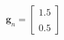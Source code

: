 \documentclass[preview]{standalone}
\begin{document}
\begin{align*}
\mathbf{g}_n = \begin{bmatrix} 1.5 \\ \\0.5 \end{bmatrix}
\end{align*}
\end{document}
